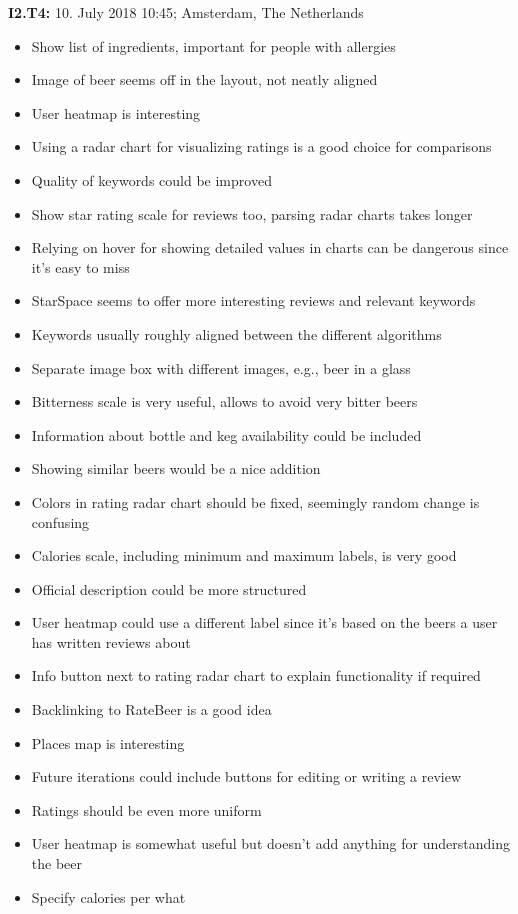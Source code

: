 \hfill

\begin{flushleft}
    \textbf{I2.T4:} 10. July 2018 10:45; Amsterdam, The Netherlands
    \begin{itemize}
        \item Show list of ingredients, important for people with allergies
        \item Image of beer seems off in the layout, not neatly aligned
        \item User heatmap is interesting
        \item Using a radar chart for visualizing ratings is a good choice for comparisons
        \item Quality of keywords could be improved
        \item Show star rating scale for reviews too, parsing radar charts takes longer
        \item Relying on hover for showing detailed values in charts can be dangerous since it's easy to miss
        \item StarSpace seems to offer more interesting reviews and relevant keywords
        \item Keywords usually roughly aligned between the different algorithms
        \item Separate image box with different images, e.g., beer in a glass
        \item Bitterness scale is very useful, allows to avoid very bitter beers
        \item Information about bottle and keg availability could be included
        \item Showing similar beers would be a nice addition
        \item Colors in rating radar chart should be fixed, seemingly random change is confusing
        \item Calories scale, including minimum and maximum labels, is very good
        \item Official description could be more structured
        \item User heatmap could use a different label since it's based on the beers a user has written reviews about
        \item Info button next to rating radar chart to explain functionality if required
        \item Backlinking to RateBeer is a good idea
        \item Places map is interesting
        \item Future iterations could include buttons for editing or writing a review
        \item Ratings should be even more uniform
        \item User heatmap is somewhat useful but doesn't add anything for understanding the beer
        \item Specify calories per what
    \end{itemize}
\end{flushleft}

